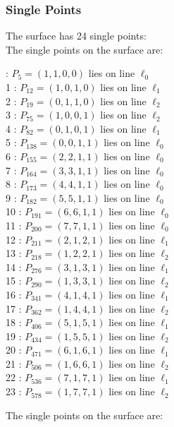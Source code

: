 \documentclass{article}
\begin{document}
{\subsubsection*{Single Points}
The surface has 24 single points:\\
The single points on the surface are:\\
\begin{multicols}{2}
 : $P_{5}=( 1, 1, 0, 0 )$ lies on line $\ell_{0}$\\
1 : $P_{12}=( 1, 0, 1, 0 )$ lies on line $\ell_{1}$\\
2 : $P_{19}=( 0, 1, 1, 0 )$ lies on line $\ell_{2}$\\
3 : $P_{75}=( 1, 0, 0, 1 )$ lies on line $\ell_{2}$\\
4 : $P_{82}=( 0, 1, 0, 1 )$ lies on line $\ell_{1}$\\
5 : $P_{138}=( 0, 0, 1, 1 )$ lies on line $\ell_{0}$\\
6 : $P_{155}=( 2, 2, 1, 1 )$ lies on line $\ell_{0}$\\
7 : $P_{164}=( 3, 3, 1, 1 )$ lies on line $\ell_{0}$\\
8 : $P_{173}=( 4, 4, 1, 1 )$ lies on line $\ell_{0}$\\
9 : $P_{182}=( 5, 5, 1, 1 )$ lies on line $\ell_{0}$\\
10 : $P_{191}=( 6, 6, 1, 1 )$ lies on line $\ell_{0}$\\
11 : $P_{200}=( 7, 7, 1, 1 )$ lies on line $\ell_{0}$\\
12 : $P_{211}=( 2, 1, 2, 1 )$ lies on line $\ell_{1}$\\
13 : $P_{218}=( 1, 2, 2, 1 )$ lies on line $\ell_{2}$\\
14 : $P_{276}=( 3, 1, 3, 1 )$ lies on line $\ell_{1}$\\
15 : $P_{290}=( 1, 3, 3, 1 )$ lies on line $\ell_{2}$\\
16 : $P_{341}=( 4, 1, 4, 1 )$ lies on line $\ell_{1}$\\
17 : $P_{362}=( 1, 4, 4, 1 )$ lies on line $\ell_{2}$\\
18 : $P_{406}=( 5, 1, 5, 1 )$ lies on line $\ell_{1}$\\
19 : $P_{434}=( 1, 5, 5, 1 )$ lies on line $\ell_{2}$\\
20 : $P_{471}=( 6, 1, 6, 1 )$ lies on line $\ell_{1}$\\
21 : $P_{506}=( 1, 6, 6, 1 )$ lies on line $\ell_{2}$\\
22 : $P_{536}=( 7, 1, 7, 1 )$ lies on line $\ell_{1}$\\
23 : $P_{578}=( 1, 7, 7, 1 )$ lies on line $\ell_{2}$\\
\end{multicols}
The single points on the surface are:\\
}
\end{document}
